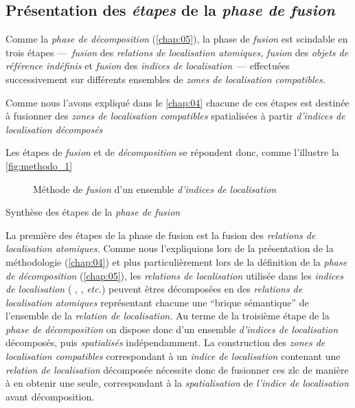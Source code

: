 \subsection{Présentation des \emph{étapes} de la \emph{phase de
    fusion}}

Comme la \emph{phase de décomposition} (\autoref{chap:05}), la phase
de \emph{fusion} est scindable en trois étapes ---~\emph{fusion} des
\emph{relations de localisation atomiques,} \emph{fusion} des
\emph{objets de référence indéfinis} et \emph{fusion} des
\emph{indices de localisation}~--- effectuées successivement sur
différents ensembles de \emph{zones de localisation compatibles.}

Comme nous l'avons expliqué dans le \autoref{chap:04} chacune de ces
étapes est destinée à fusionner des \emph{zones de localisation
  compatibles} spatialisées à partir \emph{d'indices de localisation
  décomposés}

Les étapes de \emph{fusion} et de \emph{décomposition} se répondent
donc, comme l'illustre la \autoref{fig:methodo_1}



\begin{figure}
  \centering
  
  \caption{Méthode de \emph{fusion} d'un ensemble \emph{d'indices de localisation}}
  \label{fig:methodo_fusion}
\end{figure}



\begin{table}
  \centering
   
   \caption{Synthèse des étapes de la \emph{phase de fusion}}
  \label{tab:comparaison_etapes_fusion}
\end{table}

La première des étapes de la phase de fusion est la fusion des
\emph{relations de localisation atomiques.} Comme nous l'expliquions
lors de la présentation de la méthodologie (\autoref{chap:04}) et plus
particulièrement lors de la définition de la \emph{phase de
  décomposition} (\autoref{chap:05}), les \emph{relations de
  localisation} utilisée dans les \emph{indices de localisation} (\eg
{}, , \emph{etc.})
peuvent êtres décomposées en des \emph{relations de localisation
  atomiques} représentant chacune une \enquote{brique sémantique} de
l'ensemble de la \emph{relation de localisation.} Au terme de la
troisième étape de la \emph{phase de décomposition} on dispose donc
d'un ensemble \emph{d'indices de localisation} décomposés, puis
\emph{spatialisés} indépendamment. La construction des \emph{zones de
  localisation compatibles} correspondant à un \emph{indice de
  localisation} contenant une \emph{relation de localisation}
décomposée nécessite donc de fusionner ces \ac{zlc} de manière à en
obtenir une seule, correspondant à la \emph{spatialisation} de
\emph{l'indice de localisation} avant décomposition.

